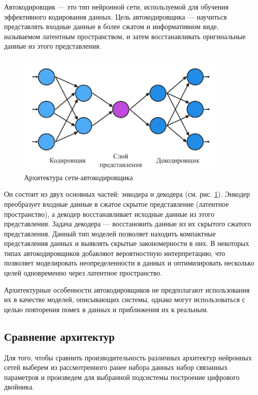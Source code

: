 Автокодировщик — это тип нейронной сети, используемой для обучения эффективного
кодирования данных. Цель автокодировщика — научиться представлять входные
данные в более сжатом и информативном виде, называемом латентным пространством,
и затем восстанавливать оригинальные данные из этого представления. 
\begin{figure}[H]
  \centering
    \includegraphics[width=0.9\textwidth]{figures/arch_autoencoder.png}
  \caption{Архитектура сети-автокодировщика}\label{fig:autoencoder}
\end{figure}

Он состоит из двух основных частей: энкодера и декодера (см. рис.
\ref{fig:autoencoder}). Энкодер преобразует входные данные в сжатое 
скрытое представление (латентное пространство), а декодер восстанавливает 
исходные данные из этого представления. Задача декодера — восстановить данные 
из их скрытого сжатого представления. Данный тип моделей позволяет находить 
компактные представления данных и выявлять скрытые закономерности в них.
В некоторых типах автокодировщиков добавляют вероятностную интерпретацию, что
позволяет моделировать неопределенности в данных и оптимизировать несколько
целей одновременно через латентное пространство.

Архитектурные особенности автокодировщиков не предполагают использования их в
качестве моделей, описывающих системы, однако могут использоваться с целью
повторения помех в данных и приближения их к реальным.

\subsection{Сравнение архитектур}

Для того, чтобы сравнить производительность различных архитектур нейронных
сетей выберем из рассмотренного ранее набора данных набор связанных параметров
и произведем для выбранной подсистемы построение цифрового двойника. 

